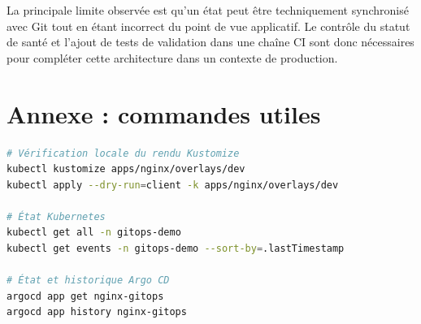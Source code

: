 \documentclass[11pt,a4paper]{article}
\begin{document}
La principale limite observée est qu'un état peut être techniquement synchronisé avec Git tout en étant incorrect du point de vue applicatif. Le contrôle du statut de santé et l'ajout de tests de validation dans une chaîne CI sont donc nécessaires pour compléter cette architecture dans un contexte de production.

\section*{Annexe : commandes utiles}

\begin{lstlisting}[language=bash]
# Vérification locale du rendu Kustomize
kubectl kustomize apps/nginx/overlays/dev
kubectl apply --dry-run=client -k apps/nginx/overlays/dev

# État Kubernetes
kubectl get all -n gitops-demo
kubectl get events -n gitops-demo --sort-by=.lastTimestamp

# État et historique Argo CD
argocd app get nginx-gitops
argocd app history nginx-gitops
\end{lstlisting}
\end{document}
